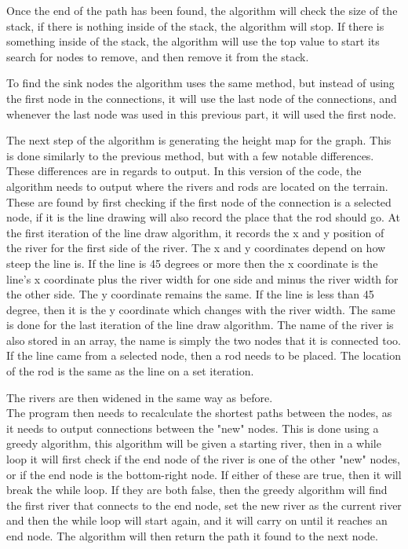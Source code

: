 	\newline
	\par
	Once the end of the path has been found, the algorithm will check the size of the stack, if there is nothing inside of the stack, the algorithm will stop. If there is something inside of the stack, the algorithm will use the top value to start its search for nodes to remove, and then remove it from the stack.
	\newline
	\par
	To find the sink nodes the algorithm uses the same method, but instead of using the first node in the connections, it will use the last node of the connections, and whenever the last node was used in this previous part, it will used the first node.
	\newline
	\par
	

	The next step of the algorithm is generating the height map for the graph. This is done similarly to the previous method, but with a few notable differences. These differences are in regards to output. In this version of the code, the algorithm needs to output where the rivers and rods are located on the terrain. These are found by first checking if the first node of the connection is a selected node, if it is the line drawing will also record the place that the rod should go. At the first iteration of the line draw algorithm, it records the x and y position of the river for the first side of the river. The x and y coordinates depend on how steep the line is. If the line is 45 degrees or more then the x coordinate is the line's x coordinate plus the river width for one side and minus the river width for the other side. The y coordinate remains the same. If the line is less than 45 degree, then it is the y coordinate which changes with the river width. The same is done for the last iteration of the line draw algorithm. The name of the river is also stored in an array, the name is simply the two nodes that it is connected too. If the line came from a selected node, then a rod needs to be placed. The location of the rod is the same as the line on a set iteration.
	\newline
	\par


	The rivers are then widened in the same way as before.\\
	The program then needs to recalculate the shortest paths between the nodes, as it needs to output connections between the "new" nodes. This is done using a greedy algorithm, this algorithm will be given a starting river, then in a while loop it will first check if the end node of the river is one of the other "new" nodes, or if the end node is the bottom-right node. If either of these are true, then it will break the while loop. If they are both false, then the greedy algorithm will find the first river that connects to the end node, set the new river as the current river and then the while loop will start again, and it will carry on until it reaches an end node. The algorithm will then return the path it found to the next node.\\

